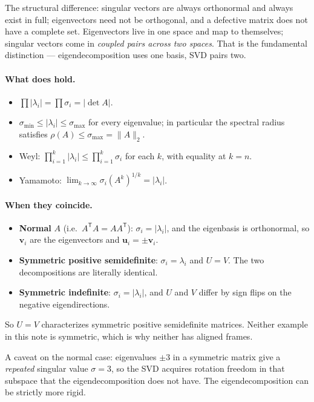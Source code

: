 \documentclass[11pt]{article}
\numberwithin{equation}{section}
\newcommand{\T}{^{\mathsf{T}}}
\newcommand{\vv}[1]{\mathbf{v}_{#1}}
\newcommand{\uu}[1]{\mathbf{u}_{#1}}
\theoremstyle{plainish}
\begin{document}
The structural difference: singular vectors are always orthonormal and always
exist in full; eigenvectors need not be orthogonal, and a defective matrix does
not have a complete set. Eigenvectors live in one space and map to themselves;
singular vectors come in \emph{coupled pairs across two spaces}. That is the
fundamental distinction --- eigendecomposition uses one basis, SVD pairs two.

\paragraph{What does hold.}
\begin{itemize}\itemsep0.3em
\item $\prod |\lambda_i| = \prod \sigma_i = |\det A|$.
\item $\sigma_{\min} \leq |\lambda_i| \leq \sigma_{\max}$ for every eigenvalue;
in particular the spectral radius satisfies $\rho(A) \leq \sigma_{\max} = \|A\|_2$.
\item Weyl: $\prod_{i=1}^k |\lambda_i| \leq \prod_{i=1}^k \sigma_i$ for each $k$,
with equality at $k = n$.
\item Yamamoto: $\lim_{k\to\infty} \sigma_i(A^k)^{1/k} = |\lambda_i|$.
\end{itemize}

\paragraph{When they coincide.}
\begin{itemize}\itemsep0.3em
\item \textbf{Normal} $A$ (i.e.\ $A\T A = AA\T$): $\sigma_i = |\lambda_i|$, and
the eigenbasis is orthonormal, so $\vv i$ are the eigenvectors and
$\uu i = \pm \vv i$.
\item \textbf{Symmetric positive semidefinite}: $\sigma_i = \lambda_i$ and
$U = V$. The two decompositions are literally identical.
\item \textbf{Symmetric indefinite}: $\sigma_i = |\lambda_i|$, and $U$ and $V$
differ by sign flips on the negative eigendirections.
\end{itemize}

\noindent
So $U = V$ characterizes symmetric positive semidefinite matrices. Neither
example in this note is symmetric, which is why neither has aligned frames.

A caveat on the normal case: eigenvalues $\pm 3$ in a symmetric matrix give a
\emph{repeated} singular value $\sigma = 3$, so the SVD acquires rotation
freedom in that subspace that the eigendecomposition does not have. The
eigendecomposition can be strictly more rigid.
\end{document}
